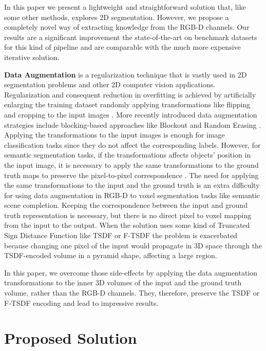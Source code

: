 In this paper we present a lightweight and straightforward solution that, like some other methods, explores 2D segmentation. However, we propose a completely novel way of extracting knowledge from the RGB-D channels. Our results are a significant improvement \wrt the state-of-the-art on benchmark datasets for this kind of pipeline and are comparable with the much more expensive iterative solution.

\textbf{Data Augmentation} is a regularization technique that is vastly used in 2D segmentation problems \cite{NIPS2012_Krizhevsky,ResNet,Lin_2017_CVPR, Jiao_2019_CVPR} and other 2D computer vision applications. Regularization and consequent reduction in overfitting is achieved by artificially enlarging the training dataset randomly applying transformations like flipping and cropping to the input images \cite{NIPS2012_Krizhevsky}.  More recently introduced data augmentation strategies include blocking-based approaches like Blockout \cite{Blockuot2016} and Random Erasing \cite{Zhong_Zheng_Kang_Li_Yang_2020}.  
Applying the transformations to the input images is enough for image classification tasks since they do not affect the corresponding labels.
However,  for semantic segmentation tasks, if the transformations affects objects' position in the input image, it is necessary to apply the same transformations to the ground truth maps to preserve the pixel-to-pixel correspondence \cite{NIPS2012_Krizhevsky}. The need for applying the same transformations to the input and the ground truth 
is an extra difficulty
for using data augmentation in RGB-D to voxel segmentation tasks like semantic scene completion. Keeping the correspondence between the input and ground truth representation is necessary, but there is no direct pixel to voxel mapping from the input to the output. When the solution uses some kind of Truncated Sign Distance Function like TSDF or F-TSDF \cite{song_semantic_2017} the problem is exacerbated because changing one pixel of the input would propagate in 3D space through the TSDF-encoded volume in a pyramid shape, affecting a large region. 

In this paper, we overcome those side-effects 
by applying the data augmentation transformations
to the inner 3D volumes of the input and the ground truth volume, rather than the RGB-D channels.
They, therefore, preserve the TSDF or F-TSDF encoding and lead to impressive results. 
     



\section{Proposed Solution}
\label{sec:proposed_solution}



